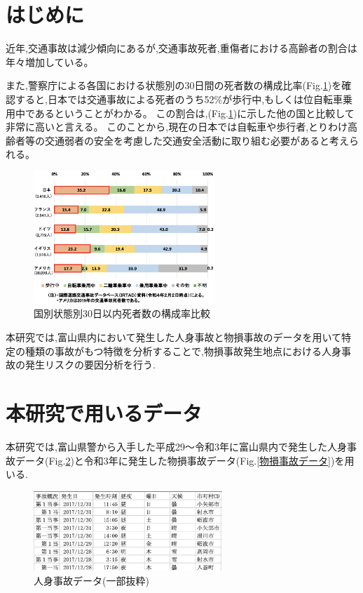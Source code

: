 \documentclass[a4j,8.5pt, twocolumn,fleqn]{jbook}
\begin{document}
\Atitle
\small
\vspace*{-2mm}

\section{はじめに}
近年,交通事故は減少傾向にあるが,交通事故死者,重傷者における高齢者の割合は年々増加している。

また,警察庁による各国における状態別の30日間の死者数の構成比率(Fig.\ref{国別状態別30日以内死者数の構成率比較})を確認すると,日本では交通事故による死者のうち52\%が歩行中,もしくは位自転車乗用中であるということがわかる。
この割合は,(Fig.\ref{国別状態別30日以内死者数の構成率比較})に示した他の国と比較して非常に高いと言える。
このことから,現在の日本では自転車や歩行者,とりわけ高齢者等の交通弱者の安全を考慮した交通安全活動に取り組む必要があると考えられる。

\begin{figure}[htb]
\centering
\includegraphics[height=50mm]{images/shibou_status.eps}
\caption{国別状態別30日以内死者数の構成率比較\cite{literature1}}
\label{国別状態別30日以内死者数の構成率比較}
\end{figure}

本研究では,富山県内において発生した人身事故と物損事故のデータを用いて特定の種類の事故がもつ特徴を分析することで,物損事故発生地点における人身事故の発生リスクの要因分析を行う.


\section{本研究で用いるデータ}
本研究では,富山県警から入手した平成29〜令和3年に富山県内で発生した人身事故データ(Fig.\ref{人身事故データ})と令和3年に発生した物損事故データ(Fig.\ref{物損事故データ})を用いる.
\begin{figure}[htb]
\centering
\includegraphics[height=30mm]{images/jinshixn.eps}
\caption{人身事故データ(一部抜粋)}
\label{人身事故データ}
\end{figure}
\end{document}
